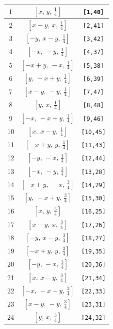 \documentclass[fleqn,8pt]{jsarticle}
\begin{document}
\begin{longtable}{ccc}
1 & $\left[ x,\, y,\, \frac{1}{4} \right]$ & {\tt [1,40]} \\ \hline
2 & $\left[ x - y,\, x,\, \frac{1}{4} \right]$ & {\tt [2,41]} \\ \hline
3 & $\left[ - y,\, x - y,\, \frac{1}{4} \right]$ & {\tt [3,42]} \\ \hline
4 & $\left[ - x,\, - y,\, \frac{1}{4} \right]$ & {\tt [4,37]} \\ \hline
5 & $\left[ - x + y,\, - x,\, \frac{1}{4} \right]$ & {\tt [5,38]} \\ \hline
6 & $\left[ y,\, - x + y,\, \frac{1}{4} \right]$ & {\tt [6,39]} \\ \hline
7 & $\left[ x - y,\, - y,\, \frac{1}{4} \right]$ & {\tt [7,47]} \\ \hline
8 & $\left[ y,\, x,\, \frac{1}{4} \right]$ & {\tt [8,48]} \\ \hline
9 & $\left[ - x,\, - x + y,\, \frac{1}{4} \right]$ & {\tt [9,46]} \\ \hline
10 & $\left[ x,\, x - y,\, \frac{1}{4} \right]$ & {\tt [10,45]} \\ \hline
11 & $\left[ - x + y,\, y,\, \frac{1}{4} \right]$ & {\tt [11,43]} \\ \hline
12 & $\left[ - y,\, - x,\, \frac{1}{4} \right]$ & {\tt [12,44]} \\ \hline
13 & $\left[ - x,\, - y,\, \frac{3}{4} \right]$ & {\tt [13,28]} \\ \hline
14 & $\left[ - x + y,\, - x,\, \frac{3}{4} \right]$ & {\tt [14,29]} \\ \hline
15 & $\left[ y,\, - x + y,\, \frac{3}{4} \right]$ & {\tt [15,30]} \\ \hline
16 & $\left[ x,\, y,\, \frac{3}{4} \right]$ & {\tt [16,25]} \\ \hline
17 & $\left[ x - y,\, x,\, \frac{3}{4} \right]$ & {\tt [17,26]} \\ \hline
18 & $\left[ - y,\, x - y,\, \frac{3}{4} \right]$ & {\tt [18,27]} \\ \hline
19 & $\left[ - x + y,\, y,\, \frac{3}{4} \right]$ & {\tt [19,35]} \\ \hline
20 & $\left[ - y,\, - x,\, \frac{3}{4} \right]$ & {\tt [20,36]} \\ \hline
21 & $\left[ x,\, x - y,\, \frac{3}{4} \right]$ & {\tt [21,34]} \\ \hline
22 & $\left[ - x,\, - x + y,\, \frac{3}{4} \right]$ & {\tt [22,33]} \\ \hline
23 & $\left[ x - y,\, - y,\, \frac{3}{4} \right]$ & {\tt [23,31]} \\ \hline
24 & $\left[ y,\, x,\, \frac{3}{4} \right]$ & {\tt [24,32]} \\
\end{longtable}
\end{document}
